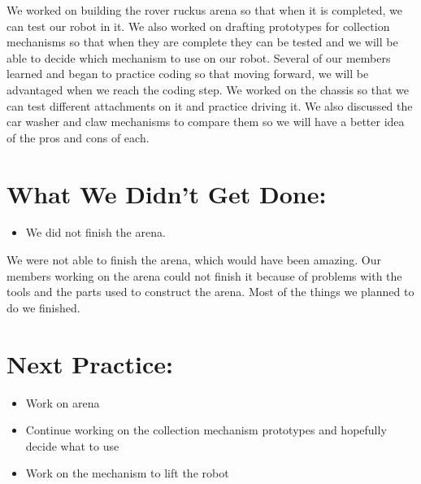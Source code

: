 \documentclass[12pt]{article}
\begin{document}
We worked on building the rover ruckus arena so that when it is completed, we can test our robot in it. We also worked on drafting prototypes for collection mechanisms so that when they are complete they can be tested and we will be able to decide which mechanism to use on our robot. Several of our members learned and began to practice coding so that moving forward, we will be advantaged when we reach the coding step. We worked on the chassis so that we can test different attachments on it and practice driving it. We also discussed the car washer and claw mechanisms to compare them so we will have a better idea of the pros and cons of each.

\section{What We Didn't Get Done:} %
\begin{itemize}
	\item We did not finish the arena.
\end{itemize}

We were not able to finish the arena, which would have been amazing. Our members working on the arena could not finish it because of problems with the tools and the parts used to construct the arena. Most of the things we planned to do we finished.

\section{Next Practice:}
\begin{itemize}
\item Work on arena
\item Continue working on the collection mechanism prototypes and hopefully decide what to use
\item Work on the mechanism to lift the robot
\end{itemize}
\end{document}

